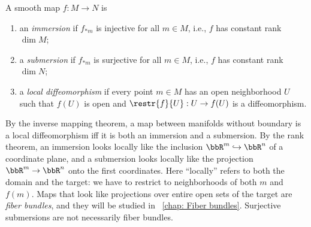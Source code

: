 \begin{defn}\label{def immersion submersion}
    A smooth map $f:M\to N$ is
    \begin{enumerate}
        \item an \emph{immersion} if $f_{\ast m}$ is injective for all $m\in M$, i.e., $f$ has constant rank $\dim M$;
        \item a \emph{submersion} if $f_{\ast m}$ is surjective for all $m\in M$, i.e., $f$ has constant rank $\dim N$;
        \item a \emph{local diffeomorphism} if every point $m\in M$ has an open neighborhood $U$ such that $f(U)$ is open and $\restr{f}{U}:U\to f(U)$ is a diffeomorphism.
    \end{enumerate}
\end{defn}
By the inverse mapping theorem, a map between manifolds without boundary is a local diffeomorphism iff it is both an immersion and a submersion. By the rank theorem, an immersion looks locally like the inclusion $\bbR^m\hookrightarrow\bbR^n$ of a coordinate plane, and a submersion looks locally like the projection $\bbR^m\to\bbR^n$ onto the first coordinates. Here ``locally'' refers to both the domain and the target: we have to restrict to neighborhoods of both $m$ and $f(m)$. Maps that look like projections over entire open sets of the target are \emph{fiber bundles}, and they will be studied in \Chap~\ref{chap: Fiber bundles}. Surjective submersions are not necessarily fiber bundles.

